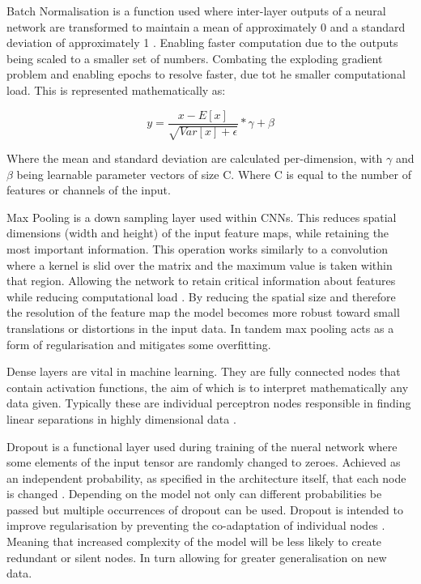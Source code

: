 \documentclass[10pt,twocolumn,letterpaper]{article}
\begin{document}
Batch Normalisation is a function used where inter-layer outputs of a neural network are transformed to maintain a mean of approximately 0 and a standard deviation of approximately 1 \cite{pytorch}. Enabling faster computation due to the outputs being scaled to a smaller set of numbers. Combating the exploding gradient problem and enabling epochs to resolve faster, due tot he smaller computational load. This is represented mathematically as:

\[y = \frac{x-E[x]}{\sqrt{Var[x]+\epsilon}} * \gamma + \beta\]

Where the mean and standard deviation are calculated per-dimension, with \(\gamma\) and \(\beta\) being learnable parameter vectors of size C. Where C is equal to the number of features or channels of the input. 

Max Pooling is a down sampling layer used within CNNs. This reduces spatial dimensions (width and height) of the input feature maps, while retaining the most important information. This operation works similarly to a convolution where a kernel is slid over the matrix and the maximum value is taken within that region. Allowing the network to retain critical information about features while reducing computational load \cite{recent_trends}. By reducing the spatial size and therefore the resolution of the feature map the model becomes more robust toward small translations or distortions in the input data. In tandem max pooling acts as a form of regularisation and mitigates some overfitting. 

Dense layers are vital in machine learning. They are fully connected nodes that contain activation functions, the aim of which is to interpret mathematically any data given. Typically these are individual perceptron nodes responsible in finding linear separations in highly dimensional data \cite{pytorch}. 

Dropout is a functional layer used during training of the nueral network where some elements of the input tensor are randomly changed to zeroes. Achieved as an independent probability, as specified in the architecture itself, that each node is changed \cite{pytorch}. Depending on the model not only can different probabilities be passed but multiple occurrences of dropout can be used. Dropout is intended to improve regularisation by preventing the co-adaptation of individual nodes \cite{hinton2012improvingneuralnetworkspreventing}. Meaning that increased complexity of the model will be less likely to create redundant or silent nodes. In turn allowing for greater generalisation on new data. 
\end{document}

